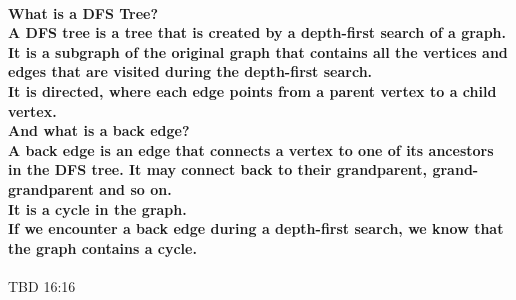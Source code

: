 \documentclass{article}
\begin{document}
\paragraph{
    What is a DFS Tree?\\
    A DFS tree is a tree that is created by a depth-first search of a graph.\\
    It is a subgraph of the original graph that contains all the vertices and edges that are visited 
    during the depth-first search.\\
    It is directed, where each edge points from a parent vertex to a child vertex.\\
    And what is a back edge?\\
    A back edge is an edge that connects a vertex to one of its ancestors in the DFS tree. 
    It may connect back to their grandparent, grand-grandparent and so on.\\
    It is a cycle in the graph.\\
    If we encounter a back edge during a depth-first search, we know that the graph contains a cycle.\\
}

TBD 16:16
\end{document}

